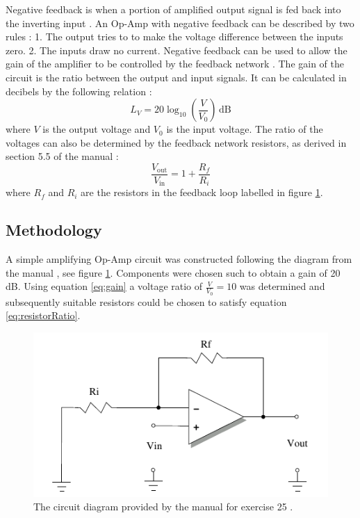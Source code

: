 \documentclass[%
reprint,
amsmath,amssymb,
aps,
floatfix
]{revtex4-2}
\begin{document}
		Negative feedback is when a portion of amplified output signal is fed back into the inverting input \cite{horowitz}. An Op-Amp with negative feedback can be described by two rules \cite{manual}: 1. The output tries to to make the voltage difference between the inputs zero. 2. The inputs draw no current. Negative feedback can be used to allow the gain of the amplifier to be controlled by the feedback network \cite{manual}. The gain of the circuit is the ratio between the output and input signals. It can be calculated in decibels by the following relation \cite{sengpiel}:
		\begin{equation}
			L_V = 20 \log_{10}\left(\frac{V}{V_0}\right)\,\text{dB}
			\label{eq:gain}
		\end{equation}where $V$ is the output voltage and $V_0$ is the input voltage. The ratio of the voltages can also be determined by the feedback network resistors, as derived in section 5.5 of the manual \cite{manual}:
		\begin{equation}
			\frac{V_\text{out}}{V_\text{in}} = 1 + \frac{R_f}{R_i}
			\label{eq:resistorRatio}
		\end{equation}where $R_f$ and $R_i$ are the resistors in the feedback loop labelled in figure \ref{fig:ex25Circuit}.
		
		\subsection{Methodology}
		A simple amplifying Op-Amp circuit was constructed following the diagram from the manual \cite{manual}, see figure \ref{fig:ex25Circuit}. Components were chosen such to obtain a gain of 20 dB. Using equation \ref{eq:gain} a voltage ratio of $\frac{V}{V_0} = 10$ was determined and subsequently suitable resistors could be chosen to satisfy equation \ref{eq:resistorRatio}.
		
		\begin{figure}
			\includegraphics[width=0.85\columnwidth]{ex25Circuit.png}
			\caption{\label{fig:ex25Circuit}The circuit diagram provided by the manual for exercise 25 \cite{manual}.}
		\end{figure}
		
\end{document}
